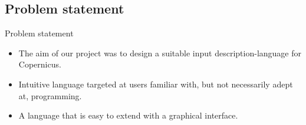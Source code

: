 %
%
%
%
%
%
%
%


\subsection*{Problem statement}
\begin{frame}{Problem statement}

\begin{itemize}\pause
\item The aim of our project was to design a suitable input
  description-language for Copernicus.\pause

\item Intuitive language targeted at users familiar with, but not
  necessarily adept at, programming.\pause

\item A language that is easy to extend with a graphical interface.
\end{itemize}

\end{frame}

